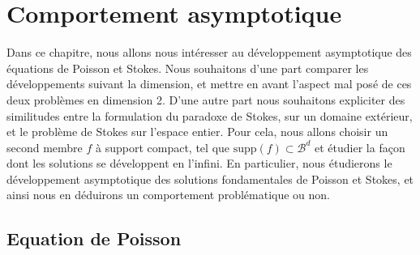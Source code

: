 \chapter{Comportement asymptotique}

Dans ce chapitre, nous allons nous intéresser au développement asymptotique des équations de Poisson et Stokes. Nous souhaitons d'une part comparer les développements suivant la dimension, et mettre en avant l'aspect mal posé de ces deux problèmes en dimension 2. D'une autre part
nous souhaitons expliciter des similitudes entre la formulation du paradoxe de Stokes, sur un domaine extérieur, et le problème de Stokes sur l'espace entier. Pour cela, nous allons choisir un second membre $f$ à support compact, tel que $\text{supp}(f) \subset \mathscr{B}^d$ et étudier la façon 
dont les solutions se développent en l'infini. En particulier, nous étudierons le développement asymptotique des solutions fondamentales de Poisson et Stokes, et ainsi nous en déduirons un comportement problématique ou non.

\section{Equation de Poisson}


